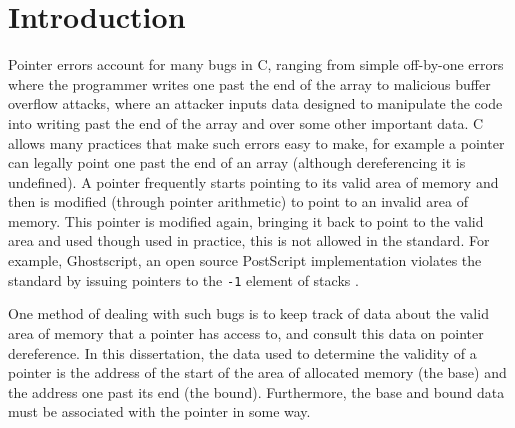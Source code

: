 \documentclass[a4paper,12pt,twoside,openright]{report}
\begin{document}
\onehalfspacing


\chapter{Introduction}
\setcounter{page}{1} 

Pointer errors account for many bugs in C, ranging from simple off-by-one errors where the programmer writes one past the end of the array to malicious buffer overflow attacks, where an attacker inputs data designed to manipulate the code into writing past the end of the array and over some other important data.
C allows many practices that make such errors easy to make, for example a pointer can legally point one past the end of an array (although dereferencing it is undefined).
A pointer frequently starts pointing to its valid area of memory and then is modified (through pointer arithmetic) to point to an invalid area of memory.
This pointer is modified again, bringing it back to point to the valid area and used though used in practice, this is not allowed in the standard.
For example, Ghostscript, an open source PostScript implementation violates the standard by issuing pointers to the \verb!-1! element of stacks \cite{ghostscript}.

One method of dealing with such bugs is to keep track of data about the valid area of memory that a pointer has access to, and consult this data on pointer dereference.
In this dissertation, the data used to determine the validity of a pointer is the address of the start of the area of allocated memory (the base) and the address one past its end (the bound).
Furthermore, the base and bound data must be associated with the pointer in some way.
\end{document}
